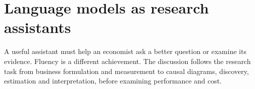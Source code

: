 \documentclass[11pt,a4paper,openany]{book}
\begin{document}










\part{Language models as research assistants}
\label{reading:part-language}
A useful assistant must help an economist ask a better question or examine
its evidence. Fluency is a different achievement. The discussion follows the
research task from business formulation and measurement to causal diagrams,
discovery, estimation and interpretation, before examining performance and cost.
\end{document}
